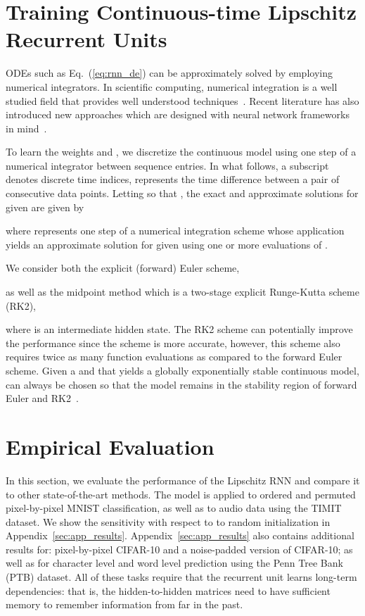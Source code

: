 \documentclass{article} \usepackage{iclr2021_conference,times}
\begin{document}
\section{Training Continuous-time Lipschitz Recurrent Units}
\label{sxn:lipshitz_recurrent_unit}

ODEs such as Eq.~(\ref{eq:rnn_de}) can be approximately solved by employing numerical integrators. In scientific computing, numerical integration is a well studied field that provides well understood techniques~\citep{LeVeque}. Recent literature has also introduced new approaches which are designed with neural network frameworks in mind~\citep{chen2018neural}. 

To learn the weights  and , we discretize the continuous model using one step of a numerical integrator between sequence entries. 
In what follows, a subscript  denotes discrete time indices,  represents the time difference between a pair of consecutive data points. Letting  so that , the exact and approximate solutions for  given  are given by

where  represents one step of a numerical integration scheme whose application yields an approximate solution for  given  using one or more evaluations of .

We consider both the explicit (forward) Euler scheme, 

as well as the midpoint method which is a two-stage explicit Runge-Kutta scheme (RK2),

where  is an intermediate hidden state.
The RK2 scheme can potentially improve the performance since the scheme is more accurate, however, this scheme also requires twice as many function evaluations as compared to the forward Euler scheme. 
Given a  and  that yields a globally exponentially stable continuous model,  can always be chosen so that the model remains in the stability region of forward Euler and RK2~\citep{LeVeque}.

\section{Empirical Evaluation}\label{sec:experiments}

In  this  section,  we  evaluate the  performance  of the Lipschitz RNN and compare it to other state-of-the-art methods.
The model is applied to ordered and permuted pixel-by-pixel MNIST classification, as well as to audio data using the TIMIT dataset.
We show the sensitivity with respect to to random initialization in Appendix~\ref{sec:app_results}. 
Appendix~\ref{sec:app_results} also contains additional results for: pixel-by-pixel CIFAR-10 and a noise-padded version of CIFAR-10; as well as for character level and word level prediction using the Penn Tree Bank (PTB) dataset.
All of these tasks require that the recurrent unit learns long-term dependencies: that is, the hidden-to-hidden matrices need to have sufficient memory to remember information from far in the past.
\end{document}
